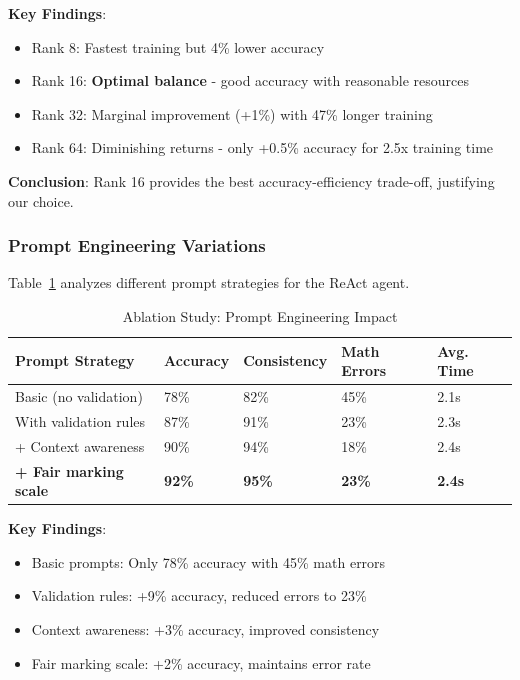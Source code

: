 \documentclass[runningheads]{llncs}
\begin{document}
\textbf{Key Findings}:
\begin{itemize}
    \item Rank 8: Fastest training but 4\% lower accuracy
    \item Rank 16: \textbf{Optimal balance} - good accuracy with reasonable resources
    \item Rank 32: Marginal improvement (+1\%) with 47\% longer training
    \item Rank 64: Diminishing returns - only +0.5\% accuracy for 2.5x training time
\end{itemize}

\textbf{Conclusion}: Rank 16 provides the best accuracy-efficiency trade-off, justifying our choice.

\subsubsection{Prompt Engineering Variations}

Table~\ref{tab:ablation-prompt} analyzes different prompt strategies for the ReAct agent.

\begin{table}[H]
\centering
\caption{Ablation Study: Prompt Engineering Impact}
\label{tab:ablation-prompt}
\begin{tabular}{@{}p{}p{}p{}p{}p{}@{}}
\toprule
Prompt Strategy & Accuracy & Consistency & Math Errors & Avg. Time \\
\midrule
Basic (no validation) & 78\% & 82\% & 45\% & 2.1s \\
With validation rules & 87\% & 91\% & 23\% & 2.3s \\
+ Context awareness & 90\% & 94\% & 18\% & 2.4s \\
\textbf{+ Fair marking scale} & \textbf{92\%} & \textbf{95\%} & \textbf{23\%} & \textbf{2.4s} \\
\bottomrule
\end{tabular}
\end{table}

\textbf{Key Findings}:
\begin{itemize}
    \item Basic prompts: Only 78\% accuracy with 45\% math errors
    \item Validation rules: +9\% accuracy, reduced errors to 23\%
    \item Context awareness: +3\% accuracy, improved consistency
    \item Fair marking scale: +2\% accuracy, maintains error rate
\end{itemize}
\end{document}
